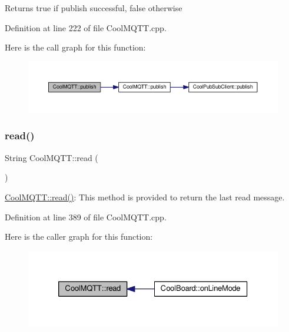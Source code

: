 \begin{DoxyReturn}{Returns}
true if publish successful, false otherwise 
\end{DoxyReturn}


Definition at line 222 of file Cool\+M\+Q\+T\+T.\+cpp.

Here is the call graph for this function\+:
\nopagebreak
\begin{figure}[H]
\begin{center}
\leavevmode
\includegraphics[width=350pt]{class_cool_m_q_t_t_a613c5e3927ae85bb94fbf648d84d8780_cgraph}
\end{center}
\end{figure}
\mbox{\label{class_cool_m_q_t_t_ae3c18f6ae9723746d32765f1c8f176ca}} 
\subsubsection{\texorpdfstring{read()}{read()}}
{\footnotesize\ttfamily String Cool\+M\+Q\+T\+T\+::read (\begin{DoxyParamCaption}{ }\end{DoxyParamCaption})}

\hyperlink{class_cool_m_q_t_t_ae3c18f6ae9723746d32765f1c8f176ca}{Cool\+M\+Q\+T\+T\+::read()}\+: This method is provided to return the last read message. 

Definition at line 389 of file Cool\+M\+Q\+T\+T.\+cpp.

Here is the caller graph for this function\+:
\nopagebreak
\begin{figure}[H]
\begin{center}
\leavevmode
\includegraphics[width=326pt]{class_cool_m_q_t_t_ae3c18f6ae9723746d32765f1c8f176ca_icgraph}
\end{center}
\end{figure}
\mbox{\label{class_cool_m_q_t_t_a5d003307eff78efbd585e42b43b72b6d}} 
